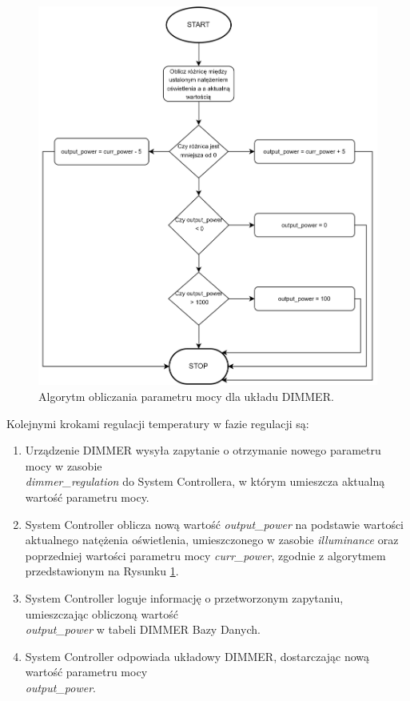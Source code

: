             \begin{figure}[H]
                \centering
                \includegraphics[width=0.8\linewidth]{graphics/dimmer-block-diagram.png}
                \caption{Algorytm obliczania parametru mocy dla układu DIMMER.}
                \label{fig:seq-dimmer-algo}
            \end{figure}

            Kolejnymi krokami regulacji temperatury w fazie regulacji są:
            \begin{enumerate}
                \item Urządzenie DIMMER wysyła zapytanie o otrzymanie nowego parametru mocy w zasobie \\ \textit{dimmer\_regulation} do System Controllera, w którym umieszcza aktualną wartość parametru mocy.
                \item System Controller oblicza nową wartość \textit{output\_power} na podstawie wartości aktualnego natężenia oświetlenia, umieszczonego w zasobie \textit{illuminance} oraz poprzedniej wartości parametru mocy \textit{curr\_power}, zgodnie z algorytmem przedstawionym na Rysunku \ref{fig:seq-dimmer-algo}.
                \item System Controller loguje informację o przetworzonym zapytaniu, umieszczając obliczoną wartość \\ \textit{output\_power} w tabeli DIMMER Bazy Danych.
                \item System Controller odpowiada układowy DIMMER, dostarczając nową wartość parametru mocy \\ \textit{output\_power}.
            \end{enumerate}

